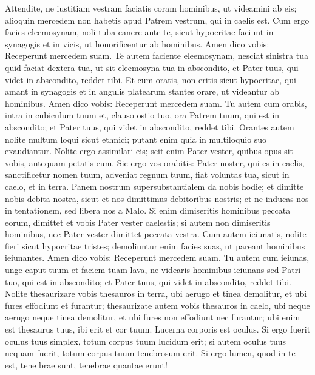 \begin{biblechapter}  
\verse Attendite, ne iustitiam vestram faciatis coram hominibus, ut videamini ab eis; alioquin mercedem non habetis apud Patrem vestrum, qui in caelis est.  
\verse Cum ergo facies eleemosynam, noli tuba canere ante te, sicut hypocritae faciunt in synagogis et in vicis, ut honorificentur ab hominibus. Amen dico vobis: Receperunt mercedem suam. 
\verse Te autem faciente eleemosynam, nesciat sinistra tua quid faciat dextera tua,  
\verse ut sit eleemosyna tua in abscondito, et Pater tuus, qui videt in abscondito, reddet tibi. 
\verse Et cum oratis, non eritis sicut hypocritae, qui amant in synagogis et in angulis platearum stantes orare, ut videantur ab hominibus. Amen dico vobis: Receperunt mercedem suam. 
\verse Tu autem cum orabis, intra in cubiculum tuum et, clauso ostio tuo, ora Patrem tuum, qui est in abscondito; et Pater tuus, qui videt in abscondito, reddet tibi. 
\verse Orantes autem nolite multum loqui sicut ethnici; putant enim quia in multiloquio suo exaudiantur. 
\verse Nolite ergo assimilari eis; scit enim Pater vester, quibus opus sit vobis, antequam petatis eum. 
\verse Sic ergo vos orabitis: Pater noster, qui es in caelis, sanctificetur nomen tuum, 
\verse adveniat regnum tuum, fiat voluntas tua, sicut in caelo, et in terra. 
\verse Panem nostrum supersubstantialem da nobis hodie; 
\verse et dimitte nobis debita nostra, sicut et nos dimittimus debitoribus nostris; 
\verse et ne inducas nos in tentationem, sed libera nos a Malo. 
\verse Si enim dimiseritis hominibus peccata eorum, dimittet et vobis Pater vester caelestis; 
\verse si autem non dimiseritis hominibus, nec Pater vester dimittet peccata vestra. 
\verse Cum autem ieiunatis, nolite fieri sicut hypocritae tristes; demoliuntur enim facies suas, ut pareant hominibus ieiunantes. Amen dico vobis: Receperunt mercedem suam. 
\verse Tu autem cum ieiunas, unge caput tuum et faciem tuam lava,  
\verse ne videaris hominibus ieiunans sed Patri tuo, qui est in abscondito; et Pater tuus, qui videt in abscondito, reddet tibi. 
\verse Nolite thesaurizare vobis thesauros in terra, ubi aerugo et tinea demolitur, et ubi fures effodiunt et furantur; 
\verse thesaurizate autem vobis thesauros in caelo, ubi neque aerugo neque tinea demolitur, et ubi fures non effodiunt nec furantur; 
\verse ubi enim est thesaurus tuus, ibi erit et cor tuum. 
\verse Lucerna corporis est oculus. Si ergo fuerit oculus tuus simplex, totum corpus tuum lucidum erit; 
\verse si autem oculus tuus nequam fuerit, totum corpus tuum tenebrosum erit. Si ergo lumen, quod in te est, tene brae sunt, tenebrae quantae erunt! 

\end{biblechapter}

